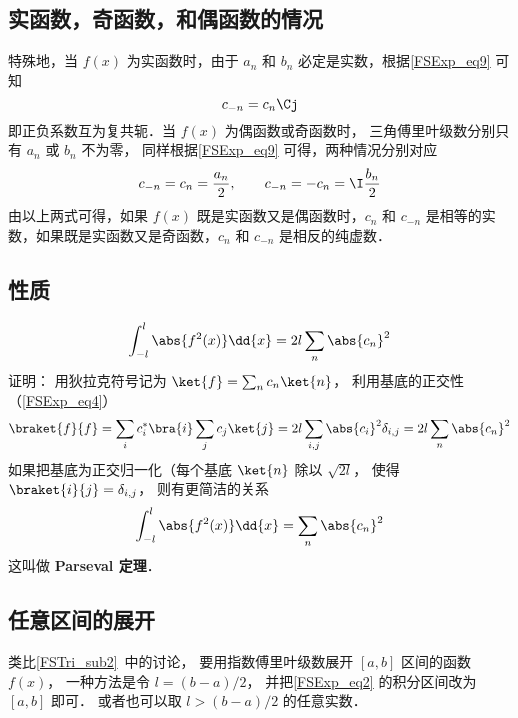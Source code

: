 \subsection{实函数，奇函数，和偶函数的情况}
特殊地，当 $f(x)$ 为实函数时，由于 $a_n$ 和 $b_n$ 必定是实数，根据\autoref{FSExp_eq9} 可知
\begin{equation}
c_{-n} = c_{n}\Cj
\end{equation}
即正负系数互为复共轭．当 $f(x)$ 为偶函数或奇函数时， 三角傅里叶级数分别只有 $a_n$ 或 $b_n$ 不为零， 同样根据\autoref{FSExp_eq9} 可得，两种情况分别对应
\begin{equation}
c_{-n} = c_n =\frac{a_n}{2}, \qquad
c_{-n} = -c_n = \I \frac{b_n}{2}
\end{equation}
由以上两式可得，如果 $f(x)$ 既是实函数又是偶函数时，$c_n$ 和 $c_{-n}$ 是相等的实数，如果既是实函数又是奇函数，$c_n$ 和 $c_{-n}$ 是相反的纯虚数．

\subsection{性质}
\begin{equation}
\int_{-l}^l \abs{f^2(x)} \dd{x} =  2l\sum_n \abs{c_n}^2
\end{equation}
证明： 用狄拉克符号记为 $\ket{f} = \sum_n c_n \ket{n}$， 利用基底的正交性（\autoref{FSExp_eq4}）
\begin{equation}
\braket{f}{f} = \sum_i c_i^* \bra{i} \sum_j c_j \ket{j} = 2l \sum_{i,j} \abs{c_i}^2 \delta_{i,j} = 2l \sum_n \abs{c_n}^2
\end{equation}
如果把基底为正交归一化（每个基底 $\ket{n}$ 除以 $\sqrt{2l}$， 使得 $\braket{i}{j} = \delta_{i,j}$， 则有更简洁的关系
\begin{equation}\label{FSExp_eq5}
\int_{-l}^l \abs{f^2(x)} \dd{x} =  \sum_n \abs{c_n}^2
\end{equation}
这叫做 \textbf{Parseval 定理}．

\subsection{任意区间的展开}
类比\autoref{FSTri_sub2}~中的讨论， 要用指数傅里叶级数展开 $[a, b]$ 区间的函数 $f(x)$， 一种方法是令 $l = (b - a)/2$， 并把\autoref{FSExp_eq2} 的积分区间改为 $[a, b]$ 即可． 或者也可以取 $l > (b - a)/2$ 的任意实数．
